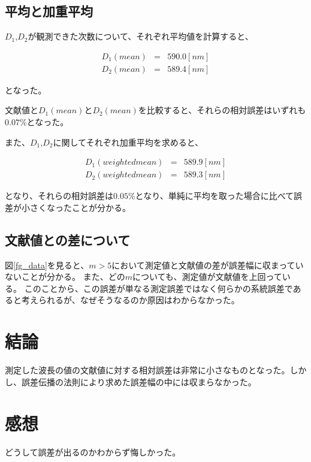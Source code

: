 \documentclass[uplatex,11pt]{jsarticle}
\newcommand{\fr}[1]{図\ref{fg_#1}}
\begin{document}
\subsection{平均と加重平均}

$D_1$,$D_2$が観測できた次数について、それぞれ平均値を計算すると、

\begin{eqnarray*}
    D_1(mean) & = & 590.0[nm] \\
    D_2(mean) & = & 589.4[nm]
\end{eqnarray*}

となった。

文献値と$D_1(mean)$と$D_2(mean)$を比較すると、それらの相対誤差はいずれも$0.07\%$となった。

また、$D_1$,$D_2$に関してそれぞれ加重平均を求めると、

\begin{eqnarray*}
    D_1(weighted mean) & = & 589.9[nm] \\
    D_2(weighted mean) & = & 589.3[nm]
\end{eqnarray*}

となり、それらの相対誤差は$0.05\%$となり、単純に平均を取った場合に比べて誤差が小さくなったことが分かる。

\subsection{文献値との差について}

\fr{data}を見ると、$m > 5$において測定値と文献値の差が誤差幅に収まっていないことが分かる。
また、どの$m$についても、測定値が文献値を上回っている。
このことから、この誤差が単なる測定誤差ではなく何らかの系統誤差であると考えられるが、なぜそうなるのか原因はわからなかった。

\section{結論}

測定した波長の値の文献値に対する相対誤差は非常に小さなものとなった。しかし、誤差伝播の法則により求めた誤差幅の中には収まらなかった。

\section{感想}

どうして誤差が出るのかわからず悔しかった。
\end{document}
